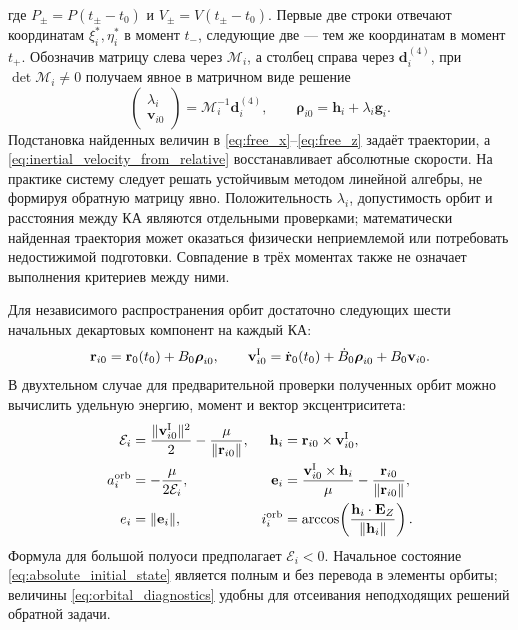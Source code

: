 \documentclass[a4paper,12pt]{article}
\begin{document}
где $P_\pm=P(t_\pm-t_0)$ и $V_\pm=V(t_\pm-t_0)$. Первые две строки отвечают координатам $\xi_i^*,\eta_i^*$ в момент $t_-$, следующие две --- тем же координатам в момент $t_+$. Обозначив матрицу слева через $\mathcal M_i$, а столбец справа через $\mathbf d_i^{(4)}$, при $\det\mathcal M_i\ne0$ получаем явное в матричном виде решение
\begin{equation}
    \begin{pmatrix}\lambda_i\\\mathbf v_{i0}\end{pmatrix}
       =\mathcal M_i^{-1}\mathbf d_i^{(4)},
    \qquad
    \boldsymbol\rho_{i0}=\mathbf h_i+\lambda_i\mathbf g_i.
    \label{eq:recovered_initial_state}
\end{equation}
Подстановка найденных величин в \eqref{eq:free_x}--\eqref{eq:free_z} задаёт траектории, а \eqref{eq:inertial_velocity_from_relative} восстанавливает абсолютные скорости. На практике систему следует решать устойчивым методом линейной алгебры, не формируя обратную матрицу явно. Положительность $\lambda_i$, допустимость орбит и расстояния между КА являются отдельными проверками; математически найденная траектория может оказаться физически неприемлемой или потребовать недостижимой подготовки. Совпадение в трёх моментах также не означает выполнения критериев между ними.

Для независимого распространения орбит достаточно следующих
шести начальных декартовых компонент на каждый КА:
\begin{equation}
 \mathbf r_{i0}=\mathbf r_0(t_0)+B_0\boldsymbol\rho_{i0},
 \qquad
 \mathbf v_{i0}^{\rm I}
  =\dot{\mathbf r}_0(t_0)
      +\dot B_0\boldsymbol\rho_{i0}
      +B_0\mathbf v_{i0}.
 \label{eq:absolute_initial_state}
\end{equation}
В двухтельном случае для предварительной проверки
полученных орбит можно вычислить удельную энергию,
момент и вектор эксцентриситета:
\begin{equation}
\begin{aligned}
 \mathcal E_i&=\frac{\|\mathbf v_{i0}^{\rm I}\|^2}{2}
                    -\frac{\mu}{\|\mathbf r_{i0}\|},
 &\mathbf h_i&=\mathbf r_{i0}\times\mathbf v_{i0}^{\rm I},\\
 a_i^{\rm orb}&=-\frac{\mu}{2\mathcal E_i},
 &\mathbf e_i&=\frac{\mathbf v_{i0}^{\rm I}\times\mathbf h_i}{\mu}
                    -\frac{\mathbf r_{i0}}{\|\mathbf r_{i0}\|},\\
 e_i&=\|\mathbf e_i\|,
 &i_i^{\rm orb}&=
       \arccos\!\left(\frac{\mathbf h_i\cdot\mathbf E_Z}
                            {\|\mathbf h_i\|}\right).
\end{aligned}
\label{eq:orbital_diagnostics}
\end{equation}
Формула для большой полуоси предполагает $\mathcal E_i<0$.
Начальное состояние \eqref{eq:absolute_initial_state} является
полным и без перевода в элементы орбиты; величины
\eqref{eq:orbital_diagnostics} удобны для отсеивания
неподходящих решений обратной задачи.
\end{document}
